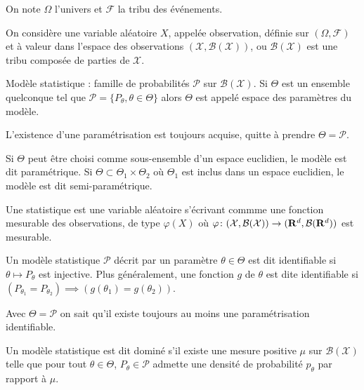 On note $\Omega$ l'univers et $\mathcal{F}$ la tribu des événements.

On considère une variable aléatoire $X$, appelée observation, définie sur $(\Omega, \mathcal{F})$ et à valeur dans l'espace des observations $(\mathcal{X}, \mathcal{B}(\mathcal{X}))$, ou $\mathcal{B}(\mathcal{X})$ est une tribu composée de parties de $\mathcal{X}$.

\begin{defn}
	Modèle statistique : famille de probabilités $\mathcal{P}$ sur $\mathcal{B}(\mathcal{X})$.
	Si $\Theta$ est un ensemble quelconque tel que $\mathcal{P} = \{ P_\theta, \theta \in \Theta \}$ alors $\Theta$ est appelé espace des paramètres du modèle.
\end{defn}

\begin{rem}
	L'existence d'une paramétrisation est toujours acquise, quitte à prendre $\Theta = \mathcal{P}$.
\end{rem}

Si $\Theta$ peut être choisi comme sous-ensemble d'un espace euclidien, le modèle est dit paramétrique.
Si $\Theta \subset \Theta_1 \times \Theta_2$ où $\Theta_1$ est inclus dans un espace euclidien, le modèle est dit semi-paramétrique.

\begin{defn}
	Une statistique est une variable aléatoire s'écrivant commme une fonction mesurable des observations, de type $\varphi(X)$ où $\varphi \colon (\mathcal{X}, \mathcal{B}(\mathcal{X})) \to (\mathbf{R}^d, \mathcal{B}(\mathbf{R}^d))$ est mesurable.
\end{defn}

\begin{defn}[Identifiabilité]
	Un modèle statistique $\mathcal{P}$ décrit par un paramètre $\theta \in \Theta$ est dit identifiable si $\theta \mapsto P_\theta$ est injective.
	Plus généralement, une fonction $g$ de $\theta$ est dite identifiable si $\left( P_{\theta_1} = P_{\theta_2} \right) \implies \left( g(\theta_1) = g(\theta_2) \right)$.
\end{defn}

\begin{rem}
	Avec $\Theta = \mathcal{P}$ on sait qu'il existe toujours au moins une paramétrisation identifiable.
\end{rem}

\begin{defn}
	Un modèle statistique est dit dominé s'il existe une mesure positive $\mu$ sur $\mathcal{B}(\mathcal{X})$ telle que pour tout $\theta \in \Theta$, $P_\theta \in \mathcal{P}$ admette une densité de probabilité $p_\theta$ par rapport à $\mu$.
\end{defn}
